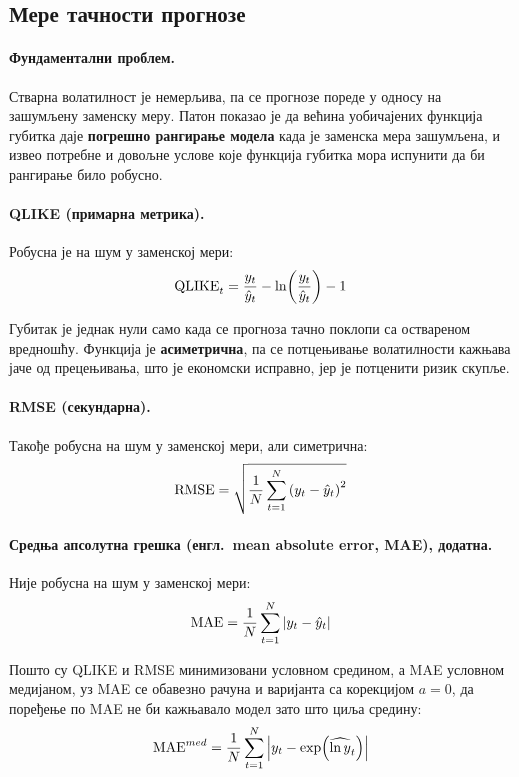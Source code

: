 \subsection{Мере тачности прогнозе}

\paragraph{Фундаментални проблем.}
Стварна волатилност је немерљива, па се прогнозе пореде у односу на зашумљену заменску
меру.
Патон \parencite{patton2011} показао је да већина уобичајених функција губитка даје
\textbf{погрешно рангирање модела} када је заменска мера зашумљена, и извео потребне и довољне
услове које функција губитка мора испунити да би рангирање било робусно.

\paragraph{QLIKE (примарна метрика).}
Робусна је на шум у заменској мери:
\begin{equation}
\mathrm{QLIKE}_t = \frac{y_t}{\hat{y}_t} - \ln\!\left(\frac{y_t}{\hat{y}_t}\right) - 1
\label{eq:qlike}
\end{equation}

Губитак је једнак нули само када се прогноза тачно поклопи са оствареном вредношћу.
Функција је \textbf{асиметрична}, па се потцењивање волатилности кажњава јаче од
прецењивања, што је економски исправно, јер је потценити ризик скупље.

\paragraph{RMSE (секундарна).}
Такође робусна на шум у заменској мери, али симетрична:
\begin{equation}
\mathrm{RMSE} = \sqrt{\frac{1}{N}\sum_{t=1}^{N}\left(y_t - \hat{y}_t\right)^{2}}
\end{equation}

\paragraph{Средња апсолутна грешка (енгл.\ mean absolute error, MAE), додатна.}
Није робусна на шум у заменској мери:
\begin{equation}
\mathrm{MAE} = \frac{1}{N}\sum_{t=1}^{N}\left|y_t - \hat{y}_t\right|
\end{equation}

Пошто су QLIKE и RMSE минимизовани условном средином, а MAE условном медијаном, уз
MAE се обавезно рачуна и варијанта са корекцијом $a = 0$, да поређење по MAE не би
кажњавало модел зато што циља средину:
\begin{equation}
\mathrm{MAE}^{med} = \frac{1}{N}\sum_{t=1}^{N}\left|y_t - \exp\!\left(\widehat{\ln y}_t\right)\right|
\end{equation}


